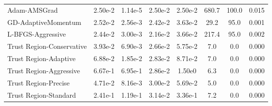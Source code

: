 \documentclass{article}
\begin{document}
\begin{table}[htbp]
{\begin{tabular}{p{2.5cm}*{7}{c}}
Adam-AMSGrad & 2.50e-2 & 1.14e-5 & 2.50e-2 & 2.50e-2 & 680.7 & 100.0 & 0.015 \\
GD-AdaptiveMomentum & 2.52e-2 & 2.56e-3 & 2.42e-2 & 3.63e-2 & 29.2 & 95.0 & 0.001 \\
L-BFGS-Aggressive & 2.44e-2 & 3.00e-3 & 2.16e-2 & 3.66e-2 & 217.4 & 95.0 & 0.002 \\
Trust Region-Conservative & 3.93e-2 & 6.90e-3 & 2.66e-2 & 5.75e-2 & 7.0 & 0.0 & 0.000 \\
Trust Region-Adaptive & 6.88e-2 & 1.85e-2 & 2.83e-2 & 8.71e-2 & 7.0 & 0.0 & 0.000 \\
Trust Region-Aggressive & 6.67e-1 & 6.95e-1 & 2.86e-2 & 1.50e0 & 6.3 & 0.0 & 0.000 \\
Trust Region-Precise & 4.71e-2 & 8.16e-3 & 3.00e-2 & 5.69e-2 & 5.0 & 0.0 & 0.000 \\
Trust Region-Standard & 2.41e-1 & 1.19e-1 & 3.14e-2 & 3.36e-1 & 7.2 & 0.0 & 0.000 \\
\bottomrule
\end{tabular}
}
\end{table}
\end{document}

